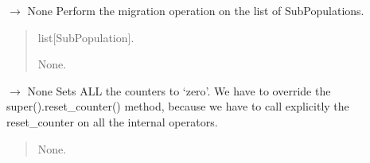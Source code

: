 \documentclass[letterpaper,10pt,english]{sphinxmanual}
\begin{document}
\begin{fulllineitems}
\begin{fulllineitems}
\begin{quote}
\begin{description}
\end{description}\end{quote}

\end{fulllineitems}


\begin{fulllineitems}
\label{\detokenize{pygenalgo.operators.migration:pygenalgo.operators.migration.meta_migration.MetaMigration.migrate}}
\pysigstartsignatures
\pysiglinewithargsret
{}
{}
{{ $\rightarrow$ None}}
\pysigstopsignatures
\sphinxAtStartPar
Perform the migration operation on the list of SubPopulations.
\begin{quote}\begin{description}
\sphinxAtStartPar
{} \textendash{} list{[}SubPopulation{]}.

\sphinxAtStartPar
None.

\end{description}\end{quote}

\end{fulllineitems}


\begin{fulllineitems}
\label{\detokenize{pygenalgo.operators.migration:pygenalgo.operators.migration.meta_migration.MetaMigration.reset_counter}}
\pysigstartsignatures
\pysiglinewithargsret
{}
{}
{{ $\rightarrow$ None}}
\pysigstopsignatures
\sphinxAtStartPar
Sets ALL the counters to ‘zero’. We have to override the super().reset\_counter()
method, because we have to call explicitly the reset\_counter on all the internal
operators.
\begin{quote}\begin{description}
\sphinxAtStartPar
None.

\end{description}\end{quote}

\end{fulllineitems}


\end{fulllineitems}
\end{document}
